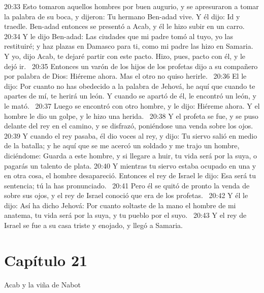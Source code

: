 20:33 Esto tomaron aquellos hombres por buen augurio, y se apresuraron a tomar la palabra de su boca, y dijeron: Tu hermano Ben-adad vive. Y él dijo: Id y traedle. Ben-adad entonces se presentó a Acab, y él le hizo subir en un carro.  
20:34 Y le dijo Ben-adad: Las ciudades que mi padre tomó al tuyo, yo las restituiré; y haz plazas en Damasco para ti, como mi padre las hizo en Samaria. Y yo, dijo Acab, te dejaré partir con este pacto. Hizo, pues, pacto con él, y le dejó ir.  
20:35 Entonces un varón de los hijos de los profetas dijo a su compañero por palabra de Dios: Hiéreme ahora. Mas el otro no quiso herirle.  
20:36 El le dijo: Por cuanto no has obedecido a la palabra de Jehová, he aquí que cuando te apartes de mí, te herirá un león. Y cuando se apartó de él, le encontró un león, y le mató.  
20:37 Luego se encontró con otro hombre, y le dijo: Hiéreme ahora. Y el hombre le dio un golpe, y le hizo una herida.  
20:38 Y el profeta se fue, y se puso delante del rey en el camino, y se disfrazó, poniéndose una venda sobre los ojos.  
20:39 Y cuando el rey pasaba, él dio voces al rey, y dijo: Tu siervo salió en medio de la batalla; y he aquí que se me acercó un soldado y me trajo un hombre, diciéndome: Guarda a este hombre, y si llegare a huir, tu vida será por la suya, o pagarás un talento de plata. 
20:40 Y mientras tu siervo estaba ocupado en una y en otra cosa, el hombre desapareció. Entonces el rey de Israel le dijo: Esa será tu sentencia; tú la has pronunciado.  
20:41 Pero él se quitó de pronto la venda de sobre sus ojos, y el rey de Israel conoció que era de los profetas.  
20:42 Y él le dijo: Así ha dicho Jehová: Por cuanto soltaste de la mano el hombre de mi anatema, tu vida será por la suya, y tu pueblo por el suyo.  
20:43 Y el rey de Israel se fue a su casa triste y enojado, y llegó a Samaria.  
\section*{Capítulo 21 }
Acab y la viña de Nabot  

